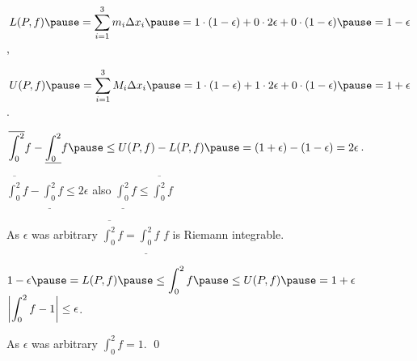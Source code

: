 \documentclass[10pt,aspectratio=169]{beamer}
\begin{document}
\begin{frame}

\begin{center}
\end{center}

\pause
\medskip

$\displaystyle
L(P,f)
\pause
= \sum_{i=1}^3 m_i \Delta x_i
\pause
=
1 \cdot (1-\epsilon) + 0 \cdot 2\epsilon + 0 \cdot (1-\epsilon)
\pause
= 1-\epsilon$,

\pause
\medskip

$\displaystyle
U(P,f)
\pause
= \sum_{i=1}^3 M_i \Delta x_i
\pause
=
1 \cdot (1-\epsilon) + 1 \cdot 2\epsilon + 0 \cdot (1-\epsilon)
\pause
= 1+\epsilon$.

\pause
\medskip

\thus\quad
$\displaystyle
\overline{\int_0^2} f - 
\underline{\int_0^2} f
\pause
\leq
U(P,f) - L(P,f)
\pause
=
(1+\epsilon)
- (1-\epsilon) = 2 \epsilon$.

\end{frame}

\begin{frame}
$\displaystyle \overline{\int_0^2} f - \underline{\int_0^2} f \leq 2 \epsilon$
\qquad
\pause
also
\qquad
$\displaystyle \underline{\int_0^2} f \leq \overline{\int_0^2} f$

\pause
\medskip

As $\epsilon$
was arbitrary
\pause
\wthus
$\displaystyle \overline{\int_0^2} f = \underline{\int_0^2} f$
\pause
\wthus
 $f$ is Riemann integrable.

\pause
\bigskip

$\displaystyle
1-\epsilon
\pause
= L(P,f)
\pause
\leq \int_0^2 f
\pause
\leq U(P,f)
\pause
=
1+\epsilon$
\pause
\wthus
$\displaystyle\biggl\lvert {\int_0^2 f - 1 } \biggr\rvert \leq \epsilon$.

\pause
\medskip

As $\epsilon$ was arbitrary
\pause
\wthus
$\displaystyle \int_0^2 f = 1$.
\qed

\end{frame}
\end{document}
